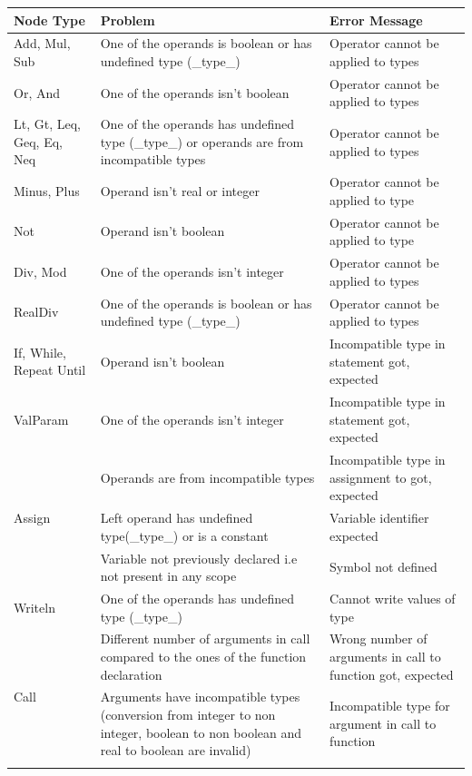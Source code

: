 \documentclass[12pt]{article}
\begin{document}
\begin{longtable} {|p{3.0cm} | p{8cm} | p{4.0cm}|}
\hline 
 \textbf{Node Type} 	& \textbf{Problem} & \textbf{Error Message} \\ \hline
	Add, Mul, Sub 		& One of the operands is boolean or has undefined type (\_type\_) & Operator cannot be applied to types \\ \hline
	Or, And 			& One of the operands isn't boolean & Operator cannot be applied to types \\ \hline
	Lt, Gt, Leq, Geq, Eq, Neq &		One of the operands has undefined type (\_type\_) or operands are from incompatible types & Operator cannot be applied to types \\ \hline
	Minus, Plus 		& Operand isn't real or integer & Operator cannot be applied to type \\ \hline
	Not 				& Operand isn't boolean & Operator cannot be applied to type \\ \hline
	Div, Mod 			& One of the operands isn't integer & Operator cannot be applied to types \\ \hline
	RealDiv				& One of the operands is boolean or has undefined type (\_type\_) & Operator cannot be applied to types \\ \hline
	If, While, Repeat Until & Operand isn't boolean & Incompatible type in statement got, expected \\ \hline
	ValParam 			& One of the operands isn't integer & Incompatible type in statement got, expected \\ \hline
	\multirow{3}{*}{Assign} & Operands are from incompatible types & Incompatible type in assignment to got, expected \\ \cline{2-3}
							& Left operand has undefined type(\_type\_) or is a constant & Variable identifier expected \\ \cline{2-3}
							& Variable not previously declared i.e not present in any scope & Symbol not defined \\ \hline
	Writeln 			& One of the operands has undefined type (\_type\_) & Cannot write values of type \\ \hline
	\multirow{3}{*}{Call} 	& Different number of arguments in call compared to the ones of the function declaration & Wrong number of arguments in call to function got, expected \\ \cline{2-3}
	 					& Arguments have incompatible types (conversion from integer to non integer, boolean to non boolean and real to boolean are invalid) & Incompatible type for argument in call to function  \\ \cline{2-3}

\end{longtable}
\end{document}
